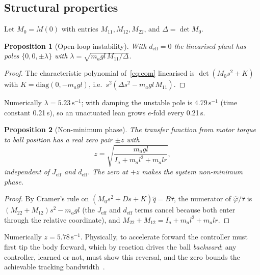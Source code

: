 \documentclass[conference]{IEEEtran}
\newtheorem{proposition}{Proposition}
\theoremstyle{remark}
\begin{document}
\subsection{Structural properties}
Let $M_0=M(0)$ with entries $M_{11},M_{12},M_{22}$, and $\Delta=\det M_0$.

\begin{proposition}[Open-loop instability]\label{prop:unstable}
With $d_{\mathrm{eff}}=0$ the linearised plant has poles $\{0,0,\pm\lambda\}$ with $\lambda=\sqrt{m_a g l\,M_{11}/\Delta}$.
\end{proposition}
\begin{proof}
The characteristic polynomial of~\eqref{eq:eom} linearised is $\det(M_0s^2+K)$ with $K=\mathrm{diag}(0,-m_agl)$, i.e.\ $s^2(\Delta s^2-m_agl\,M_{11})$.
\end{proof}
Numerically $\lambda=5.23\,\mathrm{s}^{-1}$; with damping the unstable pole is $4.79\,\mathrm{s}^{-1}$ (time constant 0.21\,s), so an unactuated lean grows $e$-fold every 0.21\,s.

\begin{proposition}[Non-minimum phase]\label{prop:nmp}
The transfer function from motor torque to ball position has a real zero pair $\pm z$ with
\begin{equation}
z=\sqrt{\frac{m_a g l}{I_a+m_a l^2+m_a l r}},
\end{equation}
independent of $J_{\mathrm{eff}}$ and $d_{\mathrm{eff}}$. The zero at $+z$ makes the system non-minimum phase.
\end{proposition}
\begin{proof}
By Cramer's rule on $(M_0s^2+Ds+K)\hat q=B\hat\tau$, the numerator of $\hat\varphi/\hat\tau$ is $(M_{22}+M_{12})s^2-m_agl$ (the $J_{\mathrm{eff}}$ and $d_{\mathrm{eff}}$ terms cancel because both enter through the relative coordinate), and $M_{22}+M_{12}=I_a+m_al^2+m_alr$.
\end{proof}
Numerically $z=5.78\,\mathrm{s}^{-1}$. Physically, to accelerate forward the controller must first tip the body forward, which by reaction drives the ball \emph{backward}; any controller, learned or not, must show this reversal, and the zero bounds the achievable tracking bandwidth~\cite{astrom2008}.
\end{document}

